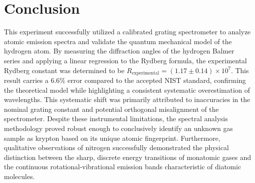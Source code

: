 \documentclass[11pt]{article}
\begin{document}
    \section{Conclusion}\label{sec:conclusion}

        This experiment successfully utilized a calibrated grating
        spectrometer to analyze atomic emission spectra and validate the
        quantum mechanical model of the hydrogen atom.
        By measuring the diffraction angles of the hydrogen Balmer series and
        applying a linear regression to the Rydberg formula, the experimental
        Rydberg constant was determined to be
        \( R_{\text{experimental}} = (1.17 \pm 0.14) \times 10^7\).
        This result carries a 6.6\% error compared to the accepted NIST
        standard, confirming the theoretical model while highlighting a
        consistent systematic overestimation of wavelengths.
        This systematic shift was primarily attributed to inaccuracies in the
        nominal grating constant and potential orthogonal misalignment of the
        spectrometer.
        Despite these instrumental limitations, the spectral analysis
        methodology proved robust enough to conclusively identify an unknown
        gas sample as krypton based on its unique atomic fingerprint.
        Furthermore, qualitative observations of nitrogen successfully
        demonstrated the physical distinction between the sharp, discrete
        energy transitions of monatomic gases and the continuous
        rotational-vibrational emission bands characteristic of diatomic
        molecules.

\printbibliography
\end{document}
